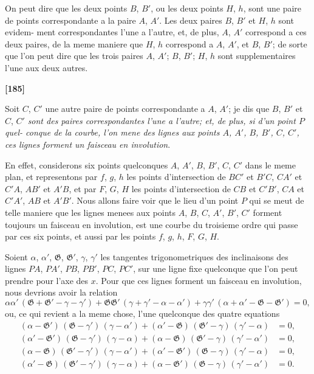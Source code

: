 \documentclass[11pt,a4paper]{book}
\begin{document}
On peut dire que les deux points $B$, $B'$, ou les deux points $H$, $h$, sont une paire
de points correspondante a la paire $A$, $A'$. Les deux paires $B$, $B'$ et $H$, $h$ sont evidem-
ment correspondantes l'une a l'autre, et, de plus, $A$, $A'$ correspond a ces deux paires,
de la meme maniere que $H$, $h$ correspond a $A$, $A'$, et $B$, $B'$; de sorte que l'on peut
dire que les trois paires $A$, $A'$; $B$, $B'$; $H$, $h$ sont supplementaires l'une aux deux autres.


\textbf{[185]}

Soit $C$, $C'$ une autre paire de points correspondante a $A$, $A'$; je dis que $B$, $B'$ et
$C$, $C'$ \textit{sont des paires correspondantes l'une a l'autre; et, de plus, si d'un point $P$ quel-
conque de la courbe, l'on mene des lignes aux points $A$, $A'$, $B$, $B'$, $C$, $C'$, ces lignes forment
un faisceau en involution}.

En effet, considerons six points quelconques $A$, $A'$, $B$, $B'$, $C$, $C'$ dans le meme plan,
et representons par $f$, $g$, $h$ les points d'intersection de $BC'$ et $B'C$, $CA'$ et $C'A$, $AB'$ et
$A'B$, et par $F$, $G$, $H$ les points d'intersection de $CB$ et $C'B'$, $CA$ et $C'A'$, $AB$ et $A'B'$.
Nous allons faire voir que le lieu d'un point $P$ qui se meut de telle maniere que les
lignes menees aux points $A$, $B$, $C$, $A'$, $B'$, $C'$ forment toujours un faisceau en involution,
est une courbe du troisieme ordre qui passe par ces six points, et aussi par les points
$f$, $g$, $h$, $F$, $G$, $H$.

Soient $\alpha$, $\alpha'$, $\mathfrak{G}$, $\mathfrak{G}'$, $\gamma$, $\gamma'$ les tangentes trigonometriques des inclinaisons des lignes
$PA$, $PA'$, $PB$, $PB'$, $PC$, $PC'$, sur une ligne fixe quelconque que l'on peut prendre pour
l'axe des $x$. Pour que ces lignes forment un faisceau en involution, nous devrions avoir
la relation
\[\alpha\alpha'\, (\mathfrak{G} + \mathfrak{G}' - \gamma - \gamma') + \mathfrak{G}\mathfrak{G}'\, (\gamma + \gamma' - \alpha - \alpha') + \gamma\gamma'\, (\alpha + \alpha' - \mathfrak{G} - \mathfrak{G}') = 0,\]
ou, ce qui revient a la meme chose, l'une quelconque des quatre equations
\begin{align*}
(\alpha - \mathfrak{G}')\, (\mathfrak{G} - \gamma')\, (\gamma - \alpha') + (\alpha' - \mathfrak{G})\, (\mathfrak{G}' - \gamma)\, (\gamma' - \alpha) &= 0,\\
(\alpha' - \mathfrak{G}')\, (\mathfrak{G} - \gamma')\, (\gamma - \alpha) + (\alpha - \mathfrak{G})\, (\mathfrak{G}' - \gamma)\, (\gamma' - \alpha') &= 0,\\
(\alpha - \mathfrak{G})\, (\mathfrak{G}' - \gamma')\, (\gamma - \alpha') + (\alpha' - \mathfrak{G}')\, (\mathfrak{G} - \gamma)\, (\gamma' - \alpha) &= 0,\\
(\alpha' - \mathfrak{G})\, (\mathfrak{G}' - \gamma')\, (\gamma - \alpha) + (\alpha - \mathfrak{G}')\, (\mathfrak{G} - \gamma)\, (\gamma' - \alpha') &= 0.
\end{align*}
\end{document}
